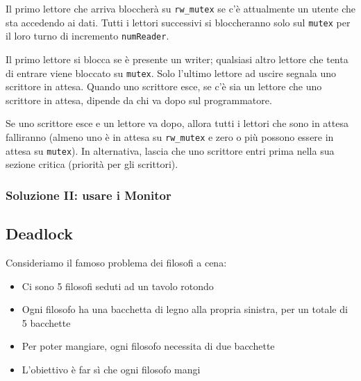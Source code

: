 \documentclass{article}
\begin{document}
Il primo lettore che arriva bloccherà su \texttt{rw\_mutex} se c'è attualmente un utente che sta accedendo ai dati. Tutti i lettori successivi si bloccheranno solo sul \texttt{mutex} per il loro turno di incremento \texttt{numReader}.\par
Il primo lettore si blocca se è presente un writer; qualsiasi altro lettore che tenta di entrare viene bloccato su \texttt{mutex}. Solo l'ultimo lettore ad uscire segnala uno scrittore in attesa. Quando uno scrittore esce, se c'è sia un lettore che uno scrittore in attesa, dipende da chi va dopo sul programmatore.\par Se uno scrittore esce e un lettore va dopo, allora tutti i lettori che sono in attesa falliranno (almeno uno è in attesa su \texttt{rw\_mutex} e zero o più possono essere in attesa su \texttt{mutex}). In alternativa, lascia che uno scrittore entri prima nella sua sezione critica (priorità per gli scrittori).


\subsubsection{Soluzione II: usare i Monitor}
\pagebreak
\subsection{Deadlock}

Consideriamo il famoso problema dei filosofi a cena:
\begin{itemize} 
    \item Ci sono 5 filosofi seduti ad un tavolo rotondo
    \item Ogni filosofo ha una bacchetta di legno alla propria sinistra, per un totale di 5 bacchette
    \item Per poter mangiare, ogni filosofo necessita di due bacchette
    \item L'obiettivo è far sì che ogni filosofo mangi
\end{itemize}
\end{document}
